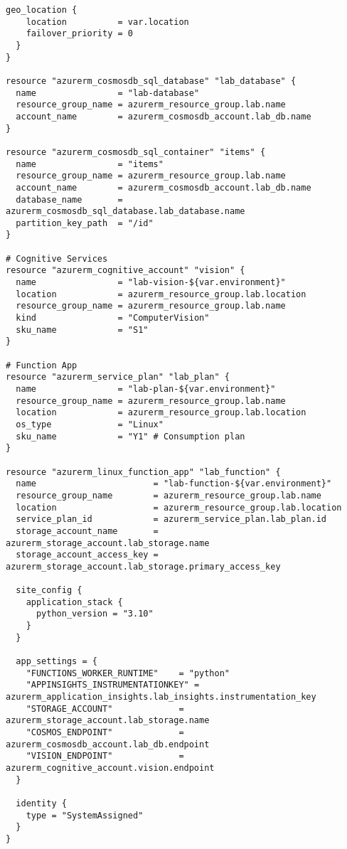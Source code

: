 \documentclass{article}
\begin{document}
\begin{lstlisting}[]
  geo_location {
    location          = var.location
    failover_priority = 0
  }
}

resource "azurerm_cosmosdb_sql_database" "lab_database" {
  name                = "lab-database"
  resource_group_name = azurerm_resource_group.lab.name
  account_name        = azurerm_cosmosdb_account.lab_db.name
}

resource "azurerm_cosmosdb_sql_container" "items" {
  name                = "items"
  resource_group_name = azurerm_resource_group.lab.name
  account_name        = azurerm_cosmosdb_account.lab_db.name
  database_name       = azurerm_cosmosdb_sql_database.lab_database.name
  partition_key_path  = "/id"
}

# Cognitive Services
resource "azurerm_cognitive_account" "vision" {
  name                = "lab-vision-${var.environment}"
  location            = azurerm_resource_group.lab.location
  resource_group_name = azurerm_resource_group.lab.name
  kind                = "ComputerVision"
  sku_name            = "S1"
}

# Function App
resource "azurerm_service_plan" "lab_plan" {
  name                = "lab-plan-${var.environment}"
  resource_group_name = azurerm_resource_group.lab.name
  location            = azurerm_resource_group.lab.location
  os_type             = "Linux"
  sku_name            = "Y1" # Consumption plan
}

resource "azurerm_linux_function_app" "lab_function" {
  name                       = "lab-function-${var.environment}"
  resource_group_name        = azurerm_resource_group.lab.name
  location                   = azurerm_resource_group.lab.location
  service_plan_id            = azurerm_service_plan.lab_plan.id
  storage_account_name       = azurerm_storage_account.lab_storage.name
  storage_account_access_key = azurerm_storage_account.lab_storage.primary_access_key

  site_config {
    application_stack {
      python_version = "3.10"
    }
  }

  app_settings = {
    "FUNCTIONS_WORKER_RUNTIME"    = "python"
    "APPINSIGHTS_INSTRUMENTATIONKEY" = azurerm_application_insights.lab_insights.instrumentation_key
    "STORAGE_ACCOUNT"             = azurerm_storage_account.lab_storage.name
    "COSMOS_ENDPOINT"             = azurerm_cosmosdb_account.lab_db.endpoint
    "VISION_ENDPOINT"             = azurerm_cognitive_account.vision.endpoint
  }

  identity {
    type = "SystemAssigned"
  }
}


\end{lstlisting}
\end{document}
